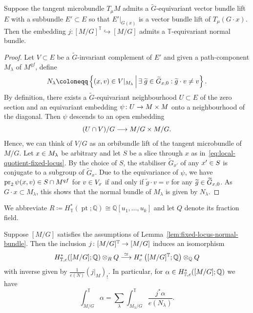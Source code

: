 \documentclass[AHL,Unicode,longabstracts]{cedram}
\newcommand{\sub}{\subset}
\newcommand{\cl}{\colon}
\newcommand{\wt}{\widetilde}
\newcommand{\bQ}{\mathbb{Q}}
\newcommand{\bT}{\mathbb{T}}
\DeclareMathOperator{\Pt}{pt}
\DeclareMathOperator{\pr}{pr}
\newcommand{\hkra}{\hookrightarrow}
\renewcommand*{\to}{\mathchoice{\longrightarrow}{\rightarrow}{\rightarrow}{\rightarrow}}
\let\oldin\in
\renewcommand{\in}{\mathchoice{\oldin}{\oldin}{\,\oldin\,}{\,\oldin\,}}
\let\oldexists\exists
\renewcommand*{\exists}{\mathrel{\oldexists}}
\begin{document}
\begin{lemm}\label{lem:fixed-locus-normal-bundle}
Suppose the tangent microbundle $T_\mu M$ admits a $\wt G$-equivariant vector bundle lift $E$ with a subbundle $E'\sub E$ so that $E'|_{G(x)}$ is a vector bundle lift of $T_\mu (G\cdot x)$. Then the embedding $j\cl [M/G]^\bT\hkra [M/G]$ admits a $\bT$-equivariant normal bundle.
\end{lemm}

\begin{proof}
Let $V\sub E$ be a $\wt G$-invariant complement of $E'$ and given a path-component $M_\lambda$ of $M^{qf}$, define
\[
N_\lambda \coloneqq \left\{(x,v)\in V|_{M_\lambda}\,\middle|\, \exists \wt g\in \wt G_{x,0}: \wt g\cdot v\neq v\right\}.
\]
By definition, there exists a $\wt G$-equivariant neighbourhood $U \sub E$ of the zero section and an equivariant embedding $\psi \cl U \to M\times M$ onto a neighbourhood of the diagonal. Then $\psi$ descends to an open embedding
\[
(U\cap V)/G\to M/G\times M/G.
\]
Hence, we can think of $V/G$ as an orbibundle lift of the tangent microbundle of $M/G$. Let $x \in M_\lambda$ be arbitrary and let $S$ be a slice through $x$ as in~\eqref{eq:local-quotient-fixed-locus}. By the choice of $S$, the stabiliser $\wt G_{x'}$ of any $x'\in S$ is conjugate to a subgroup of $\wt G_{x}$. Due to the equivariance of $\psi$, we have $\pr_2\psi(x,v)\in S\cap M^{qf}$ for $v \in V_x$ if and only if $\wt g\cdot v = v$ for any $\wt g\in \wt G_{x,0}$. As $G\cdot x \sub M_\lambda$, this shows that the normal bundle of $M_\lambda$ is given by $N_\lambda$.
\end{proof}

We abbreviate $R \coloneqq H^*_\bT(\Pt;\bQ) \cong \bQ[u_1,\dots,u_k]$ and let $Q$ denote its fraction field.


\begin{prop}\label{prop:orbifold-localisation}
Suppose $[M/G]$ satisfies the assumptions of Lemma~\ref{lem:fixed-locus-normal-bundle}. Then the inclusion $j \cl [M/G]^\bT\to [M/G]$ induces an isomorphism
\[
H^*_{\bT,c}([M/G];\bQ)\otimes_R Q\overset{\simeq}{\to} H^*_c\left([M/G]^\bT;\bQ\right)\otimes_\bQ Q
\]
with inverse given by $\frac{1}{e(N)}(j|_{M})_!$. In particular, for $\alpha\in H^*_{\bT,c}([M/G];\bQ)$ we have
\begin{equation}\label{eq:integration-formula-orbifold}
\int^\bT_{M/G} \alpha = \sum_{\lambda}{\int^\bT_{M_\lambda/G}}\frac{j^*\alpha}{e(N_\lambda)}.
\end{equation}
\end{prop}
\end{document}
